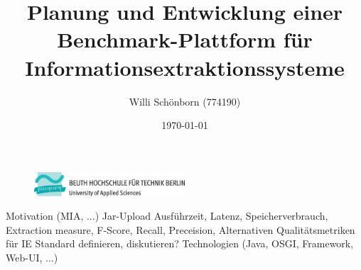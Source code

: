 \documentclass[a4paper,12pt]{article}
\title{Planung und Entwicklung einer Benchmark-Plattform für Informationsextraktionssysteme}
\author{Willi Schönborn (774190)}
\date{\today}
\begin{document}
\begin{figure}[H]
\centering
\includegraphics[width=0.5\textwidth]{beuth.eps}
\maketitle
\end{figure}

Motivation (MIA, ...)
Jar-Upload
Ausführzeit, Latenz, Speicherverbrauch,
Extraction measure, F-Score, Recall, Preceision, Alternativen
Qualitätsmetriken für IE
Standard definieren, diskutieren?
Technologien (Java, OSGI, Framework, Web-UI, ...)

\newpage
\nocite{*}
\printbibliography
\end{document}
